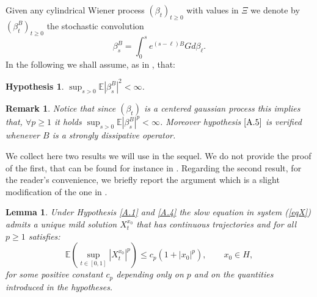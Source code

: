 \documentclass[reqno,a4paper,11 pt]{article}
\def \E {\mathbb{E}}
\newtheorem{lemma}[theorem]{Lemma}
\newtheorem{hypothesis}[theorem]{Hypothesis}
\newtheorem{remark}[theorem]{Remark}
\numberwithin{equation}{section}
\begin{document}
Given any cylindrical Wiener process $(\beta_t)_{t\geq 0}$ with values in $\Xi$ we denote by $(\beta^B_t)_{t\geq 0}$ the stochastic convolution
$$\beta^B_s=\int_0^s e^{(s-\ell)B}Gd\beta_{\ell}.$$
In the following we shall assume, as in \cite{FuHuTes}, that:
\begin{hypothesis}
 \label{A.5}  $\sup_{s>0}\E|\beta^B_s|^2<\infty$.
 
 
\end{hypothesis}

\begin{remark}
Notice that since $(\beta_t)$ is a centered gaussian process this implies that,   $\forall p\geq 1$ it holds $\sup_{s>0}\E|\beta^B_s|^p<\infty$. Moreover hypothesis $\ref{A.5}$ is  verified whenever $B$
is a strongly dissipative operator.
\end{remark}
We collect here two results we will use in the sequel.
We do not provide the proof of the first, that can be found for instance in \cite[Proposition 3.2]{FuTes}. Regarding the second result, for the reader's convenience, we briefly
 report the argument which is a slight modification of the one in \cite[section 6.3.2.]{daza2}.

\begin{lemma}\label{stimaX} Under Hypothesis \ref{A.1}  and \ref{A.4} the slow equation in system  (\ref{eqX}) admits a unique mild solution $X^{x_0}_t$ that has continuous trajectories and  
 for all $ p \geq 1$ satisfies:
 \begin{equation}\label{stimaslow}
 \E(\sup_{t\in [0,1]}|X^{x_0}_t|^p)\leq c_p(1+|x_0|^p), \qquad x_0 \in H,
 \end{equation}
 for some positive constant $c_p$ depending only on $p$ and on the quantities introduced in the hypotheses.
\end{lemma}
\end{document}

